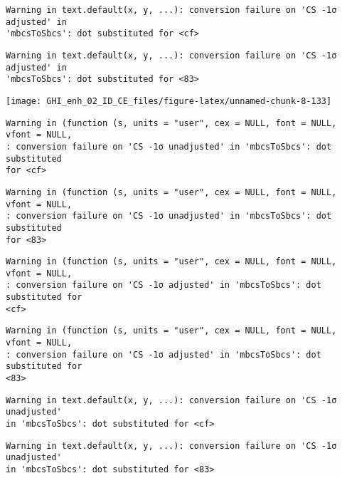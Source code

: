 \documentclass[
  10pt,
  a4paper,oneside]{article}
\begin{document}
\begin{verbatim}
Warning in text.default(x, y, ...): conversion failure on 'CS -1σ adjusted' in
'mbcsToSbcs': dot substituted for <cf>
\end{verbatim}

\begin{verbatim}
Warning in text.default(x, y, ...): conversion failure on 'CS -1σ adjusted' in
'mbcsToSbcs': dot substituted for <83>
\end{verbatim}

\begin{center}\texttt{[image: GHI\_enh\_02\_ID\_CE\_files/figure-latex/unnamed-chunk-8-133]} \end{center}

\begin{verbatim}
Warning in (function (s, units = "user", cex = NULL, font = NULL, vfont = NULL,
: conversion failure on 'CS -1σ unadjusted' in 'mbcsToSbcs': dot substituted
for <cf>
\end{verbatim}

\begin{verbatim}
Warning in (function (s, units = "user", cex = NULL, font = NULL, vfont = NULL,
: conversion failure on 'CS -1σ unadjusted' in 'mbcsToSbcs': dot substituted
for <83>
\end{verbatim}

\begin{verbatim}
Warning in (function (s, units = "user", cex = NULL, font = NULL, vfont = NULL,
: conversion failure on 'CS -1σ adjusted' in 'mbcsToSbcs': dot substituted for
<cf>
\end{verbatim}

\begin{verbatim}
Warning in (function (s, units = "user", cex = NULL, font = NULL, vfont = NULL,
: conversion failure on 'CS -1σ adjusted' in 'mbcsToSbcs': dot substituted for
<83>
\end{verbatim}

\begin{verbatim}
Warning in text.default(x, y, ...): conversion failure on 'CS -1σ unadjusted'
in 'mbcsToSbcs': dot substituted for <cf>
\end{verbatim}

\begin{verbatim}
Warning in text.default(x, y, ...): conversion failure on 'CS -1σ unadjusted'
in 'mbcsToSbcs': dot substituted for <83>
\end{verbatim}
\end{document}
